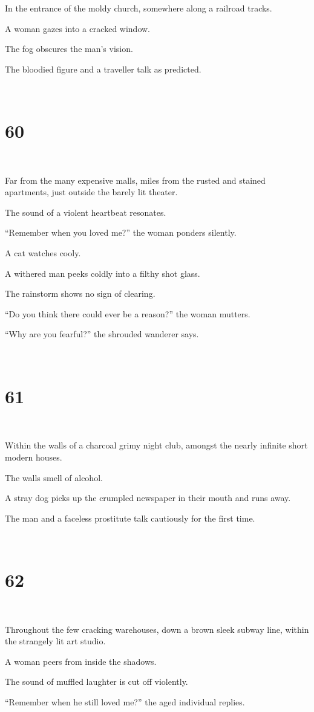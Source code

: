 \documentclass{report}
\begin{document}
In the entrance of the moldy church, somewhere along a railroad tracks.

A woman gazes into a cracked window.

The fog obscures the man's vision.

The bloodied figure and a traveller talk as predicted.

~
\chapter*{60}
~

Far from the many expensive malls, miles from the rusted and stained apartments, just outside the barely lit theater.

The sound of a violent heartbeat resonates.

``Remember when you loved me?'' the woman ponders silently.

A cat watches cooly.

A withered man peeks coldly into a filthy shot glass.

The rainstorm shows no sign of clearing.

``Do you think there could ever be a reason?'' the woman mutters.

``Why are you fearful?'' the shrouded wanderer says.

~
\chapter*{61}
~

Within the walls of a charcoal grimy night club, amongst the nearly infinite short modern houses.

The walls smell of alcohol.

A stray dog picks up the crumpled newspaper in their mouth and runs away.

The man and a faceless prostitute talk cautiously for the first time.

~
\chapter*{62}
~

Throughout the few cracking warehouses, down a brown sleek subway line, within the strangely lit art studio.

A woman peers from inside the shadows.

The sound of muffled laughter is cut off violently.

``Remember when he still loved me?'' the aged individual replies.
\end{document}
